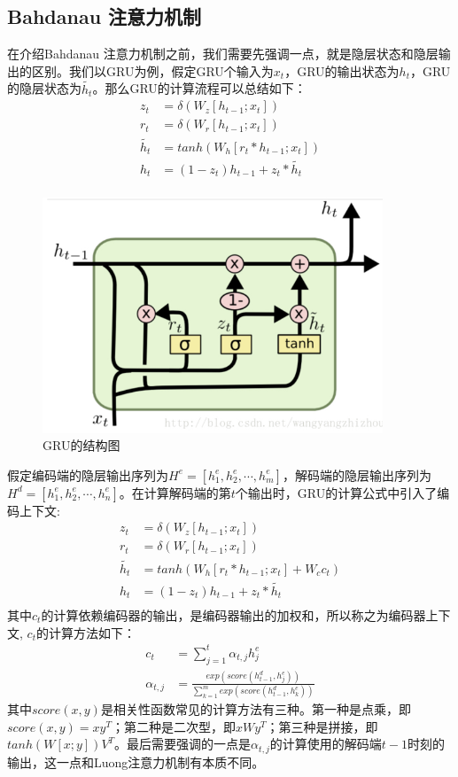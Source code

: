 \documentclass[twoside,a4paper,12pt]{book}%
\begin{document}
\subsection{Bahdanau 注意力机制}
在介绍Bahdanau 注意力机制之前，我们需要先强调一点，就是隐层状态和隐层输出的区别。我们以\gls{GRU}为例，假定\gls{GRU}个输入为$x_t$，\gls{GRU}的输出状态为$h_t$，\gls{GRU}的隐层状态为$\widetilde{h_t}$。那么\gls{GRU}的计算流程可以总结如下：
$$
\begin{aligned}
z_t&=\delta (W_z[h_{t-1};x_t]) \\
r_t&=\delta (W_r[h_{t-1};x_t]) \\
\widetilde{h_t} &= tanh(W_h[r_t*h_{t-1};x_t]) \\
h_t&=(1-z_t)h_{t-1} + z_t*\widetilde{h_t} \\
\end{aligned}
$$
\begin{figure}[htbp]
\begin{center}
\includegraphics[width=4.0in]{figures/nmt-atn-lstm0.png}
\caption{GRU的结构图}
\label{fig:nmt-atn-lstm0}
\end{center}
\end{figure}
假定编码端的隐层输出序列为$H^e=[h^e_1,h^e_2,\cdots,h^e_m]$，解码端的隐层输出序列为$H^d=[h^e_1,h^e_2,\cdots,h^e_n]$。在计算解码端的第$t$个输出时，\gls{GRU}的计算公式中引入了编码上下文:
$$
\begin{aligned}
z_t&=\delta (W_z[h_{t-1};x_t]) \\
r_t&=\delta (W_r[h_{t-1};x_t]) \\
\widetilde{h_t} &= tanh(W_h[r_t*h_{t-1};x_t] + W_cc_t) \\
h_t&=(1-z_t)h_{t-1} + z_t*\widetilde{h_t} \\
\end{aligned}
$$
其中$c_t$的计算依赖编码器的输出，是编码器输出的加权和，所以称之为编码器上下文, $c_t$的计算方法如下：
$$
\begin{aligned}
c_t&=\sum_{j=1}^{t}{\alpha_{t,j}h^e_j}\\
\alpha_{t,j} &= \frac{exp(score(h^d_{t-1},h^e_j))}{\sum_{k=1}^{m}{exp(score(h^d_{t-1},h^e_k))}}
\end{aligned}
$$
其中$score(x,y)$是相关性函数常见的计算方法有三种。第一种是点乘，即$score(x,y)=xy^T$；第二种是二次型，即$xWy^T$；第三种是拼接，即$tanh(W[x;y])V^T$。最后需要强调的一点是$\alpha_{t,j}$的计算使用的解码端$t-1$时刻的输出，这一点和Luong注意力机制有本质不同。
\end{document}
